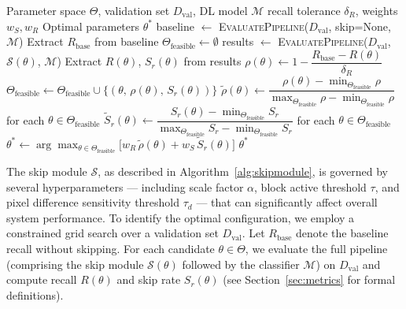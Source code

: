 \documentclass[final,3p,times,twocolumn]{elsarticle}
\begin{document}
\begin{algorithm}[t]
\caption{Skip Module Hyperparameter Selection}
\label{alg:hyperparam}
\begin{algorithmic}[1]
\Require Parameter space $\Theta$, validation set $D_{\text{val}}$,
DL model $\mathcal{M}$
\Param recall tolerance $\delta_R$, weights $w_S, w_R$
\Ensure Optimal parameters $\theta^*$
\State baseline $\gets$ \textsc{EvaluatePipeline}($D_{\text{val}}$, skip=None, $\mathcal{M}$)
\State Extract $R_{\text{base}}$ from baseline
\State $\Theta_{\text{feasible}} \gets \emptyset$
\State results $\gets$ \textsc{EvaluatePipeline}($D_{\text{val}}$, $\mathcal{S}(\theta)$, $\mathcal{M}$)
\State Extract $R(\theta)$, $S_r(\theta)$ from results
\State $\rho(\theta) \gets 1 - \dfrac{R_{\text{base}} - R(\theta)}{\delta_R}$
\State $\Theta_{\text{feasible}} \gets \Theta_{\text{feasible}} \cup \{(\theta,\, \rho(\theta),\, S_r(\theta))\}$
\EndIf
\EndFor
{}
\State $\tilde{\rho}(\theta) \gets \dfrac{\rho(\theta) -
\min_{\Theta_{\text{feasible}}}\rho}{\max_{\Theta_{\text{feasible}}}\rho
- \min_{\Theta_{\text{feasible}}}\rho}$ \quad for each $\theta \in \Theta_{\text{feasible}}$
\State $\tilde{S}_r(\theta) \gets \dfrac{S_r(\theta) -
\min_{\Theta_{\text{feasible}}}S_r}{\max_{\Theta_{\text{feasible}}}S_r
- \min_{\Theta_{\text{feasible}}}S_r}$ \quad for each $\theta \in \Theta_{\text{feasible}}$
\State $\theta^* \gets \arg\max_{\theta \in \Theta_{\text{feasible}}}
\bigl[ w_R\,\tilde{\rho}(\theta) + w_S\,\tilde{S}_r(\theta) \bigr]$
\State \Return $\theta^*$
\end{algorithmic}
\end{algorithm}

The skip module $\mathcal{S}$, as described in Algorithm~\ref{alg:skipmodule},
is governed by several hyperparameters --- including scale factor
$\alpha$, block active threshold $\tau$, and pixel difference
sensitivity threshold $\tau_d$ --- that can significantly affect overall
system performance. To identify the optimal configuration, we employ a
constrained grid search over a validation set $D_{\text{val}}$. Let
$R_{\text{base}}$ denote the baseline recall without skipping. For each
candidate $\theta \in \Theta$, we evaluate the full pipeline (comprising
the skip module $\mathcal{S}(\theta)$ followed by the classifier
$\mathcal{M}$) on $D_{\text{val}}$ and compute recall $R(\theta)$ and
skip rate $S_r(\theta)$ (see Section~\ref{sec:metrics} for formal
definitions).
\end{document}

